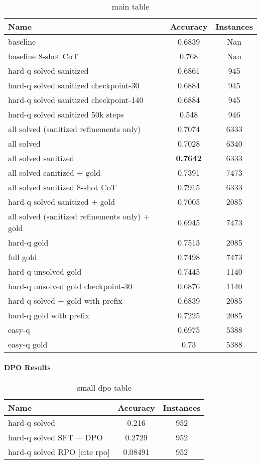 \documentclass[a4paper,10pt]{article}
\begin{document}
\begin{table}[ht]
\centering
\begin{tabular}{|l|c|c|}
\hline
\textbf{Name} & \textbf{Accuracy} & \textbf{Instances} \\
\hline
baseline & 0.6839 & Nan\\
baseline 8-shot CoT & 0.768 & Nan \\
hard-q solved sanitized& 0.6861 & 945\\
hard-q solved sanitized checkpoint-30 & 0.6884 & 945\\
hard-q solved sanitized checkpoint-140 & 0.6884 & 945\\
hard-q solved sanitized 50k steps &  0.548  & 946 \\
all solved (sanitized refinements only)& 0.7074 & 6333\\
all solved & 0.7028 & 6340\\
all solved sanitized & \textbf{0.7642}  & 6333\\
all solved sanitized + gold & 0.7391 & 7473 \\
all solved sanitized 8-shot CoT & 0.7915 & 6333 \\ 
hard-q solved sanitized + gold & 0.7005  & 2085\\
all solved (sanitized refinements only) + gold & 0.6945 & 7473 \\
hard-q gold & 0.7513 & 2085 \\
full gold & 0.7498 & 7473 \\
hard-q unsolved gold & 0.7445 & 1140 \\
hard-q unsolved gold checkpoint-30 & 0.6876 & 1140 \\
hard-q solved + gold with prefix & 0.6839 & 2085 \\
hard-q gold with prefix & 0.7225 & 2085 \\
easy-q & 0.6975 & 5388 \\ 
easy-q gold & 0.73 & 5388 \\
\hline
\end{tabular}
\caption{main table}
\end{table}

\paragraph{DPO Results}

\begin{table}[ht]
\centering
 \begin{tabular}{|l|c|c|}
 \hline
 \textbf{Name} & \textbf{Accuracy} & \textbf{Instances} \\
 \hline
 hard-q solved & 0.216 & 952 \\
 hard-q solved SFT + DPO & 0.2729 & 952 \\
 hard-q solved RPO [cite rpo] & 0.08491 & 952 \\
 \hline
 \end{tabular}
 \caption{small dpo table}
\end{table}
\end{document}
